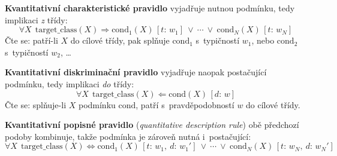 \documentclass[11pt,a4paper]{article}
\theoremstyle{definition}
\begin{document}
\begin{defbox}
\textbf{Kvantitativní charakteristické pravidlo} vyjadřuje nutnou podmínku, tedy implikaci
\emph{z} třídy:
\[ \forall X\ \ \mathrm{target\_class}(X)\Rightarrow \mathrm{cond}_1(X)\,[t{:}\,w_1]\ \vee\
   \cdots\ \vee\ \mathrm{cond}_N(X)\,[t{:}\,w_N] \]
Čte se: patří-li $X$ do cílové třídy, pak splňuje $\mathrm{cond}_1$ s~typičností $w_1$, nebo
$\mathrm{cond}_2$ s~typičností $w_2$, \dots

\textbf{Kvantitativní diskriminační pravidlo} vyjadřuje naopak postačující podmínku, tedy
implikaci \emph{do} třídy:
\[ \forall X\ \ \mathrm{target\_class}(X)\Leftarrow \mathrm{cond}(X)\,[d{:}\,w] \]
Čte se: splňuje-li $X$ podmínku $\mathrm{cond}$, patří s~pravděpodobností $w$ do cílové třídy.

\textbf{Kvantitativní popisné pravidlo} (\emph{quantitative description rule}) obě předchozí
podoby kombinuje, takže podmínka je zároveň nutná i~postačující:
\[ \forall X\ \ \mathrm{target\_class}(X)\Leftrightarrow \mathrm{cond}_1(X)\,
   [t{:}\,w_1,\ d{:}\,w_1']\ \vee\ \cdots\ \vee\ \mathrm{cond}_N(X)\,[t{:}\,w_N,\ d{:}\,w_N'] \]
\end{defbox}
\end{document}
